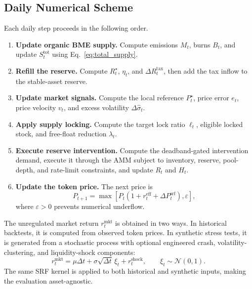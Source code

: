 \documentclass[a4paper,fleqn]{cas-dc}
\begin{document}
\subsection{Daily Numerical Scheme}
\label{subsec:numerical_scheme}

Each daily step proceeds in the following order.

\begin{enumerate}
    \item \textbf{Update organic BME supply.} Compute emissions $M_t$, burns $B_t$, and update $S_t^{\mathrm{tot}}$ using Eq.~\eqref{eq:total_supply}.
    \item \textbf{Refill the reserve.} Compute $R_t^{\star}$, $\eta_t$, and $\Delta R_t^{\mathrm{tax}}$, then add the tax inflow to the stable-asset reserve.
    \item \textbf{Update market signals.} Compute the local reference $P_t^{\star}$, price error $e_t$, price velocity $v_t$, and excess volatility $\Delta\widehat{\sigma}_t$.
    \item \textbf{Apply supply locking.} Compute the target lock ratio $\ell_t$, eligible locked stock, and free-float reduction $\lambda_t$.
    \item \textbf{Execute reserve intervention.} Compute the deadband-gated intervention demand, execute it through the AMM subject to inventory, reserve, pool-depth, and rate-limit constraints, and update $R_t$ and $H_t$.
    \item \textbf{Update the token price.} The next price is
    \begin{equation}
    P_{t+1}
    =
    \max
    \left[
    P_t
    \left(
    1+r_t^{\mathrm{eff}}+\Delta P_t^{\mathrm{srf}}
    \right),
    \varepsilon
    \right],
    \label{eq:price_update}
    \end{equation}
    where $\varepsilon>0$ prevents numerical underflow.
\end{enumerate}

The unregulated market return $r_t^{\mathrm{mkt}}$ is obtained in two ways. In historical backtests, it is computed from observed token prices. In synthetic stress tests, it is generated from a stochastic process with optional engineered crash, volatility-clustering, and liquidity-shock components:
\begin{equation}
r_t^{\mathrm{mkt}}
=
\mu \Delta t
+
\sigma\sqrt{\Delta t}\,\xi_t
+
r_t^{\mathrm{shock}},
\qquad
\xi_t\sim\mathcal{N}(0,1).
\label{eq:synthetic_return}
\end{equation}
The same SRF kernel is applied to both historical and synthetic inputs, making the evaluation asset-agnostic.
\end{document}
